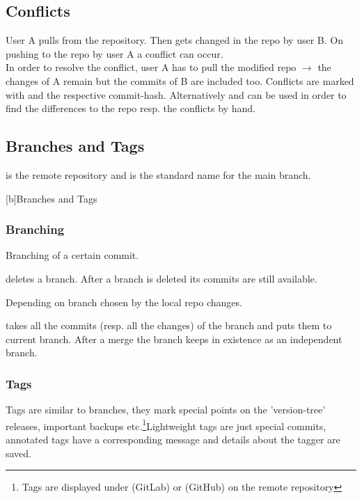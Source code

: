 \subsection{Conflicts}
User A pulls  from the repository. Then  gets changed in the repo by user B. On pushing  to the repo by user A a conflict can occur. \\
In order to resolve the conflict, user A has to pull the modified repo $\rightarrow$ the changes of A remain but the commits of B are included too. Conflicts are marked with  and the respective commit-hash.
Alternatively  and  can be used in order to find the differences to the repo resp. the conflicts by hand.
\newpage
\subsection{Branches and Tags}
 is the remote repository and  is the standard name for the main branch.
\begin{center}

[b]{Branches and Tags}
\end{center}

\subsubsection{Branching}
Branching of a certain commit.

 deletes a branch. After a branch is deleted its commits are still available.

Depending on branch chosen by  the local repo changes.


 takes all the commits (resp. all the changes) of the branch and puts them to current branch. After a merge the branch keeps in existence as an independent branch.



\newpage
\subsubsection{Tags}
Tags are similar to branches, they mark special points on the 'version-tree' releases, important backups etc.\footnote{Tags are displayed under  (GitLab) or  (GitHub) on the remote repository}Lightweight tags are just special commits, annotated tags have a corresponding message and details about the tagger are saved.

